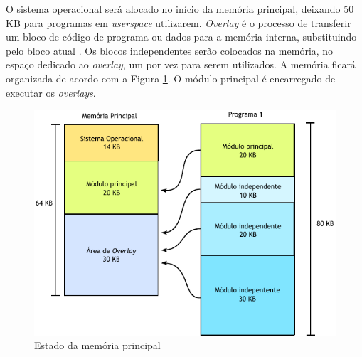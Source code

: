 
O sistema operacional será alocado no início da memória principal, deixando
50 KB para programas em \textsl{userspace} utilizarem.  \textsl{Overlay} é o 
processo de transferir um bloco de código de programa ou dados para a memória interna,
substituindo pelo bloco atual \cite{OxfordDictionary}.  Os blocos independentes
serão colocados na memória, no espaço dedicado ao \textsl{overlay}, um por vez 
para serem utilizados.  A memória
ficará organizada de acordo com a Figura \ref{OverlayPDF}.  O módulo principal
é encarregado de executar os \textsl{overlays}.

\begin{figure}[!ht]
  \centering
	\includegraphics[scale=1]{img/overlay.pdf}
  \caption{Estado da memória principal \label{OverlayPDF}}
\end{figure}

